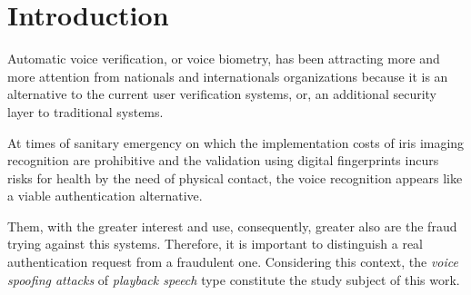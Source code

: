 \vspace*{+5pt}
\section{Introduction}
\label{introduction}
		\par Automatic voice verification, or voice biometry, has been attracting more and more attention from nationals and internationals organizations because it is an alternative to the current user verification systems, or, an additional security layer to  traditional systems.
		
		\par At times of sanitary emergency on which the implementation costs of iris imaging recognition are prohibitive and the validation using digital fingerprints incurs risks for health by the need of physical contact, the voice recognition appears like a viable authentication alternative.
				
		\par Them, with the greater interest and use, consequently, greater also are the fraud trying against this systems. Therefore, it is important to distinguish a real authentication request from a fraudulent one. Considering this context, the \textit{voice spoofing attacks} of \textit{playback speech} type constitute the study subject of this work.